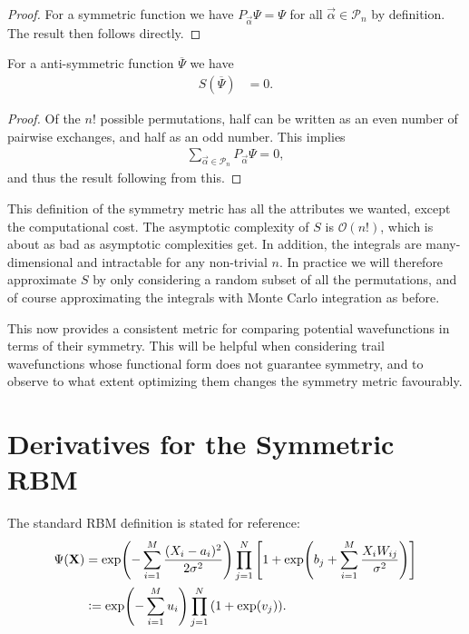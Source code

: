 \documentclass[Thesis.tex]{subfiles}
\begin{document}
\begin{proof}
    For a symmetric function we have $P_{\vec\alpha}\Psi=\Psi$ for all
    $\vec\alpha\in\mathcal{P}_n$ by definition. The result then follows directly.\end{proof}
\begin{corollary}
    For a anti-symmetric function $\overline\Psi$ we have
    \begin{align}
        S(\overline\Psi)&=0.
    \end{align}
\end{corollary}
\begin{proof}
   Of the $n!$ possible permutations, half can be written as an even number of
    pairwise exchanges, and half as an odd number. This implies
    \begin{align}
        \sum_{\vec\alpha\in \mathcal{P}_n} P_{\vec\alpha}\Psi = 0,
    \end{align}
    and thus the result following from this.
\end{proof}

This definition of the symmetry metric has all the attributes we wanted, except
the computational cost. The asymptotic complexity of $S$ is $\mathcal{O}(n!)$,
which is about as bad as asymptotic complexities get. In addition, the integrals
are many-dimensional and intractable for any non-trivial $n$. In practice we
will therefore approximate $S$ by only considering a random subset of all the
permutations, and of course approximating the integrals with Monte Carlo
integration as before.

This now provides a consistent metric for comparing potential wavefunctions in
terms of their symmetry. This will be helpful when considering trail
wavefunctions whose functional form does not guarantee symmetry, and to observe
to what extent optimizing them changes the symmetry metric favourably.

\section{Derivatives for the Symmetric RBM}

The standard RBM definition is stated for reference:
\begin{align}\label{eq:rbm-re-def}
    \Psi(\mathbf{X}) &= \exp(-\sum_{i=1}^M \frac{(X_i - a_i)^2}{2\sigma^2} )
                        \prod_{j=1}^N\qty[1 + \exp(b_j + \sum_{i=1}^M \frac{X_i
                        W_{ij}}{\sigma^2})]\\
    &\vcentcolon= \exp(-\sum_{i=1}^Mu_i)\prod_{j=1}^N\qty(1 + \exp(v_j)).
\end{align}
\end{document}
